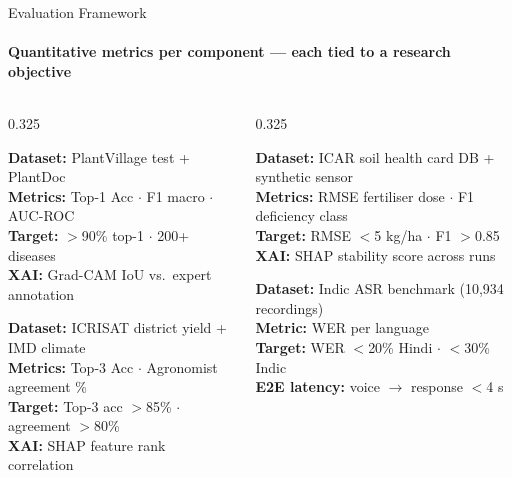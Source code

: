 \documentclass[aspectratio=169, 10pt]{beamer}
\begin{document}
\begin{frame}{Evaluation Framework}
  \framesubtitle{Quantitative metrics per component — each tied to a research objective}

  \begin{columns}[T]
    \begin{column}{0.325\textwidth}
      \begin{tcolorbox}[agricard=Coral, title=Disease diagnostic (O2), before skip=0pt, after skip=4pt,
        fonttitle=\bfseries\footnotesize]
        \tiny
        \textbf{Dataset:} PlantVillage test + PlantDoc\\
        \textbf{Metrics:} Top-1 Acc $\cdot$ F1 macro $\cdot$ AUC-ROC\\
        \textbf{Target:} $>$90\% top-1 $\cdot$ 200+ diseases\\
        \textbf{XAI:} Grad-CAM IoU vs.\ expert annotation
      \end{tcolorbox}
      \begin{tcolorbox}[agricard=Green, title=Crop recommendation (O4), before skip=0pt,
        fonttitle=\bfseries\footnotesize]
        \tiny
        \textbf{Dataset:} ICRISAT district yield + IMD climate\\
        \textbf{Metrics:} Top-3 Acc $\cdot$ Agronomist agreement \%\\
        \textbf{Target:} Top-3 acc $>$85\% $\cdot$ agreement $>$80\%\\
        \textbf{XAI:} SHAP feature rank correlation
      \end{tcolorbox}
    \end{column}

    \begin{column}{0.325\textwidth}
      \begin{tcolorbox}[agricard=Amber, title=Nutrition agent (O3), before skip=0pt, after skip=4pt,
        fonttitle=\bfseries\footnotesize]
        \tiny
        \textbf{Dataset:} ICAR soil health card DB + synthetic sensor\\
        \textbf{Metrics:} RMSE fertiliser dose $\cdot$ F1 deficiency class\\
        \textbf{Target:} RMSE $<$5 kg/ha $\cdot$ F1 $>$0.85\\
        \textbf{XAI:} SHAP stability score across runs
      \end{tcolorbox}
      \begin{tcolorbox}[agricard=Blue, title=ASR / Voice pipeline (O6), before skip=0pt,
        fonttitle=\bfseries\footnotesize]
        \tiny
        \textbf{Dataset:} Indic ASR benchmark (10{,}934 recordings)\\
        \textbf{Metric:} WER per language\\
        \textbf{Target:} WER $<$20\% Hindi $\cdot$ $<$30\% Indic\\
        \textbf{E2E latency:} voice $\rightarrow$ response $<$4 s
      \end{tcolorbox}
    \end{column}


\end{columns}
\end{frame}
\end{document}
